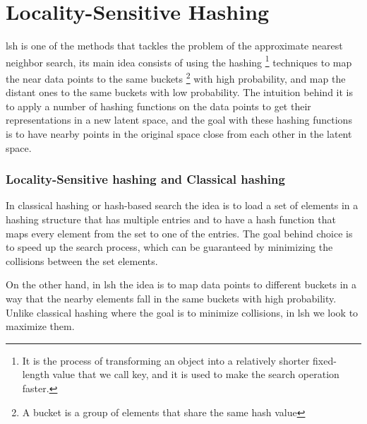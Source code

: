 \section{Locality-Sensitive Hashing}

\acrfull{lsh} is one of the methods that tackles the problem of the approximate
nearest neighbor search, its main idea consists of using the hashing
\footnote{It is the process of transforming an object into a relatively shorter
    fixed-length value that we call key, and it is used to make the search operation
    faster.} techniques to map the near data points to the same buckets \footnote{A
    bucket is a group of elements that share the same hash value} with high
probability, and map the distant ones to the same buckets with low probability.
The intuition behind it is to apply a number of hashing functions on the data
points to get their representations in a new latent space, and the goal with
these hashing functions is to have nearby points in the original space close
from each other in the latent space.


\subsubsection{Locality-Sensitive hashing and Classical hashing}
In classical hashing or hash-based search the idea is to load a set of elements
in a hashing structure that has multiple entries and to have a hash function
that maps every element from the set to one of the entries. The goal behind
choice is to speed up the search process, which can be guaranteed by minimizing
the collisions between the set elements.

On the other hand, in \acrlong{lsh} the idea is to map data points to different
\glspl{bucket} in a way that the nearby elements fall in the same buckets with high
probability. Unlike classical hashing where the goal is to minimize collisions,
in \acrshort{lsh} we look to maximize them.
